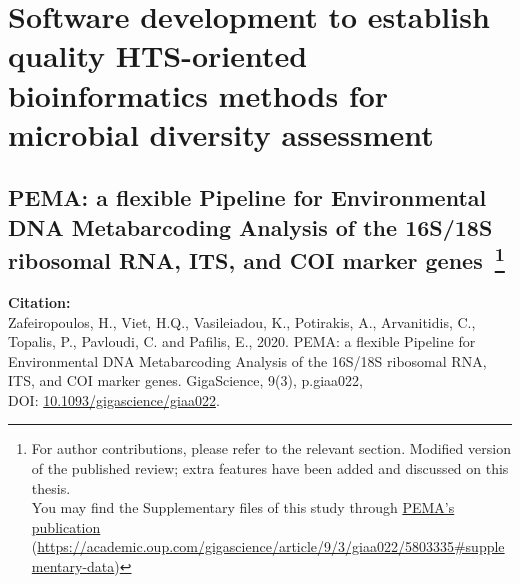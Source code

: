 % 
% 

\chapter{Software development to establish quality HTS-oriented bioinformatics methods for microbial diversity assessment}
\label{cha:2}


% 
% 
\section[PEMA: a flexible Pipeline for Environmental DNA Metabarcoding Analysis of the 16S/18S ribosomal RNA, ITS, and COI marker genes]{
   PEMA: a flexible Pipeline for Environmental DNA Metabarcoding Analysis of the 16S/18S ribosomal RNA, ITS, and COI marker genes~\footnote{
      For author contributions, please refer to the relevant section. Modified version of the published review; extra features have been added and discussed on this thesis.\\
      You may find the Supplementary files of this study through 
      \href{https://academic.oup.com/gigascience/article/9/3/giaa022/5803335\#supplementary-data}{PEMA's publication}
      (\href{https://academic.oup.com/gigascience/article/9/3/giaa022/5803335\#supplementary-data}{https://academic.oup.com/gigascience/article/9/3/giaa022/5803335\#supplementary-data})
   }
}
\label{publ:pema}

   \textbf{Citation:} \\ 
   Zafeiropoulos, H., Viet, H.Q., Vasileiadou, K., Potirakis, A., Arvanitidis, C., Topalis, P., Pavloudi, C. and Pafilis, E., 2020. PEMA: a flexible Pipeline for Environmental DNA Metabarcoding Analysis of the 16S/18S ribosomal RNA, ITS, and COI marker genes. GigaScience, 9(3), p.giaa022, \\ 
   DOI: \href{https://doi.org/10.1093/gigascience/giaa022}{10.1093/gigascience/giaa022}.


